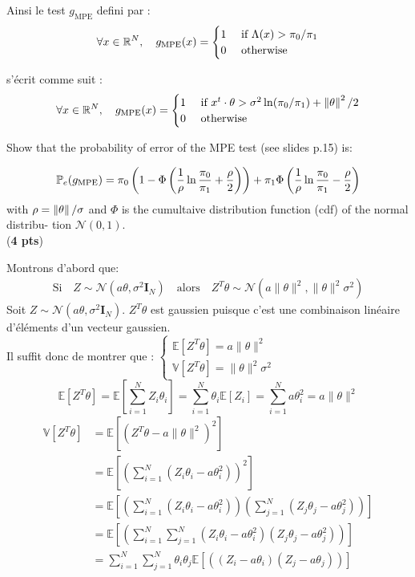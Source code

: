 \documentclass[12pt,a4paper]{article}
\begin{document}
 Ainsi le test $g_\text{MPE}$ defini par : 
 $$  \forall x \in \mathbb{R}^N,\quad g_\text{MPE}(x) = \begin{cases}
    1 &\text{ if } \Lambda(x) > \pi_0/\pi_1  \\
    0 & \text{ otherwise } \end{cases} $$

s'écrit comme suit :
$$ \forall x \in \mathbb{R}^N,\quad g_\text{MPE}(x) = \begin{cases}
    1 &\text{ if } x^t\cdot\theta >\sigma^2\ln(\pi_0/\pi_1) + \left\|{\theta}\right\|^2/2 \\
    0 & \text{ otherwise } 
\end{cases} $$


\begin{tquesto}{}{}
Show that the probability of error of the MPE test (see slides p.15) is:

$$ \mathbb{P}_e (g_\text{MPE}) =   \pi_0 \left( 1-\Phi \left( \dfrac{1}{\rho}\ln\dfrac{\pi_0}{\pi_1} + \dfrac{\rho}{2}\right) \right) +\pi_1 \Phi \left( \dfrac{1}{\rho}\ln\dfrac{\pi_0}{\pi_1} - \dfrac{\rho}{2}\right) $$
with $\rho = \left\|{\theta}\right\|/\sigma$ and $\Phi$ is the cumultaive distribution function (cdf) of the normal distribu-
tion $\mathcal{N}(0,1)$.\\
(\textbf{4 pts})
\end{tquesto}
Montrons d'abord que:
\begin{align*}
	\text{Si} \quad Z \sim \mathcal{N}(a\theta, \sigma^2\mathbf{I}_N) \quad \text{alors} \quad Z^T\theta \sim \mathcal{N}(a\|\theta\|^2, \|\theta\|^2\sigma^2)
\end{align*}
Soit $ Z \sim \mathcal{N}(a\theta, \sigma^2\mathbf{I}_N) $.  $ Z^T\theta $ est gaussien puisque c'est une combinaison linéaire d'éléments d'un vecteur gaussien.\\
Il suffit donc de montrer que :
$\begin{cases}
	\mathbb{E}[Z^T\theta] = a\|\theta\|^2 \\
	\mathbb{V}[Z^T\theta] = \|\theta\|^2\sigma^2 
\end{cases}$\\
$$
	\mathbb{E}[Z^T\theta] = \mathbb{E}\left[\sum_{i=1}^{N} Z_{i}\theta_{i}\right] = \sum_{i=1}^{N} \theta_{i} \mathbb{E}[Z_{i}] = \sum_{i=1}^{N} a\theta_{i}^2 = a\|\theta\|^2 $$
\begin{align*}
	\mathbb{V}[Z^T\theta] & =
	 \mathbb{E}[(Z^T\theta - a\|\theta\|^2)^2] \\ & =\mathbb{E}[(\sum_{i=1}^{N} (Z_{i}\theta_{i} - a\theta_{i}^2))^2] \\ & =
	 \mathbb{E}[(\sum_{i=1}^{N} (Z_{i}\theta_{i} - a\theta_{i}^2))(\sum_{j=1}^{N} (Z_{j}\theta_{j} - a\theta_{j}^2))]  \\ & =
	  \mathbb{E}[(\sum_{i=1}^{N} \sum_{j=1}^{N} (Z_{i}\theta_{i} - a\theta_{i}^2)(Z_{j}\theta_{j} - a\theta_{j}^2))]\\ & =
	  \sum_{i=1}^{N} \sum_{j=1}^{N} \theta_{i}\theta_{j}\mathbb{E}[( (Z_{i} - a\theta_{i})(Z_{j} - a\theta_{j}))]
\end{align*}
\end{document}
